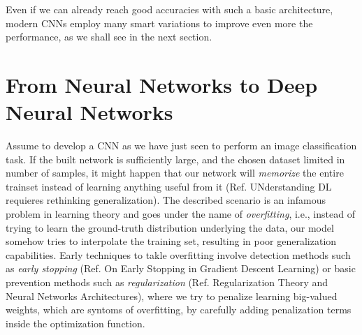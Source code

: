 \documentclass[LaM,binding=0.6cm]{./packages/sapthesis/sapthesis}
\begin{document}
            Even if we can already reach good accuracies with such a basic architecture, modern CNNs employ many smart variations to improve even more the performance,
            as we shall see in the next section. 

        \section{From Neural Networks to Deep Neural Networks}
        Assume to develop a CNN as we have just seen to perform an image classification task. If the built network is sufficiently large, and the chosen dataset limited
        in number of samples, it might happen that our network will \textit{memorize} the entire trainset instead of learning anything useful from it (Ref. 
        UNderstanding DL requieres rethinking generalization). The described scenario is an infamous problem in learning theory and goes under the name of \textit{overfitting},
        i.e., instead of trying to learn the ground-truth distribution underlying the data, our model somehow tries to interpolate the training set, 
        resulting in poor generalization capabilities. 
        Early techniques to takle overfitting involve detection methods such as \textit{early stopping} (Ref. On Early Stopping in Gradient Descent Learning) 
        or basic prevention methods such as \textit{regularization} (Ref. Regularization Theory and Neural Networks Architectures),
        where we try to penalize learning big-valued weights, which are syntoms of overfitting, by carefully adding penalization terms inside the optimization function.
\end{document}
